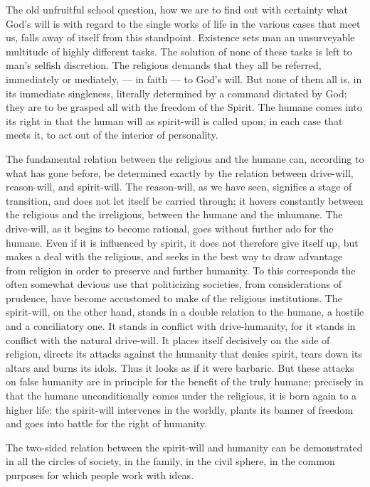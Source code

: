 \documentclass[12pt,a4paper,openany]{book}
\newcommand{\opage}[1]{\marginnote{\footnotesize\textit{[#1]}}}
\begin{document}
The old unfruitful school question, how we are
to find out with certainty what God's will is with
regard to the single works of life in the various
cases that meet us, falls away of itself from this standpoint.
Existence sets man an unsurveyable multitude
of highly different tasks. The solution of none of these tasks
\setcounter{footnote}{0}%
\opage{75}is left to man's selfish discretion.
The religious demands that they all be referred, immediately or
mediately, --- in faith --- to God's will. But
none of them all is, in its immediate singleness, literally
determined by a command dictated by God; they are to
be grasped all with the freedom of the Spirit. The humane comes into
its right in that the human will as spirit-will is called upon, in
each case that meets it, to act out of the
interior of personality.

The fundamental relation between the religious and the humane
can, according to what has gone before, be determined exactly by
the relation between drive-will, reason-will, and spirit-will.
The reason-will, as we have seen, signifies a stage of transition,
and does not let itself be carried through; it hovers constantly
between the religious and the irreligious, between the humane and the inhumane.
The drive-will, as it begins to become rational, goes without
further ado for the humane. Even if it is influenced
by spirit, it does not therefore give itself up, but makes
a deal with the religious, and seeks in the best way to
draw advantage from religion in order to preserve and further humanity.
To this corresponds the often somewhat devious
use that politicizing societies, from considerations of prudence, have
become accustomed to make of the religious institutions.
The spirit-will, on the other hand, stands in a double relation to the
humane, a hostile and a conciliatory one. It stands in conflict
with drive-humanity, for it stands in conflict with the
natural drive-will. It places itself decisively on the side of
religion, directs its attacks against the humanity that denies spirit,
tears down its altars and burns its idols.
Thus it looks as if it were barbaric. But these
attacks on false humanity are in principle for the benefit of
the truly humane; precisely in that the humane
unconditionally comes under the religious, it is born again
to a higher life: the spirit-will intervenes in the worldly,
plants its banner of freedom and goes into battle for the right of
humanity.

\setcounter{footnote}{0}%
\opage{76}The two-sided relation between the spirit-will and humanity
can be demonstrated in all the circles of society, in
the family, in the civil sphere, in the common
purposes for which people work with ideas.
\end{document}
